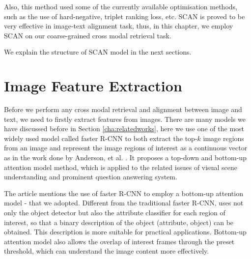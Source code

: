 Also, this method used some of the currently available optimisation methods, such as the use of hard-negative, triplet ranking loss, etc. SCAN is proved to be very effective in image-text alignment task, thus, in this chapter, we employ SCAN on our coarse-grained cross modal retrieval task.



We explain the structure of SCAN model in the next sections.

\section{Image Feature Extraction}
Before we perform any cross modal retrieval and alignment between image and text, we need to firstly extract features from images. There are many models we have discussed before in Section \ref{cha:relatedworks}, here we use one of the most widely used model called faster R-CNN to both extract the top-$k$ image regions from an image and represent the image regions of interest as a continuous vector as in the work done by Anderson, et al. \cite{bottomup}. It proposes a top-down and bottom-up attention model method, which is applied to the related issues of visual scene understanding and prominent question answering system.  

The article mentions the use of faster R-CNN to employ a bottom-up attention model - that we adopted. Different from the traditional faster R-CNN, \cite{bottomup} uses not only the object detector but also the attribute classifier for each region of interest, so that a binary description of the object (attribute, object) can be obtained. This description is more suitable for practical applications. Bottom-up attention model also allows the overlap of interest frames through the preset threshold, which can understand the image content more effectively.



